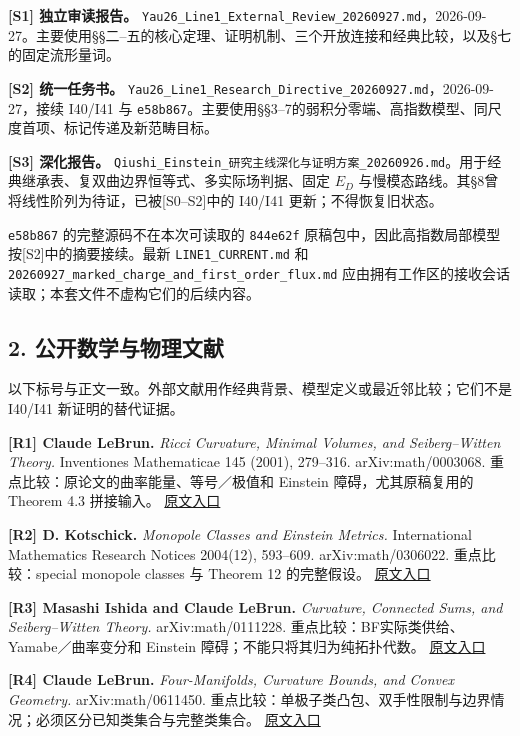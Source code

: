 \documentclass[UTF8,a4paper,11pt,fontset=fandol]{ctexart}
\begin{document}
\textbf{{[}S1{]} 独立审读报告。}
\texttt{Yau26\_Line1\_External\_Review\_20260927.md}，2026-09-27。主要使用§§二--五的核心定理、证明机制、三个开放连接和经典比较，以及§七的固定流形量词。

\textbf{{[}S2{]} 统一任务书。}
\texttt{Yau26\_Line1\_Research\_Directive\_20260927.md}，2026-09-27，接续
I40/I41 与
\texttt{e58b867}。主要使用§§3--7的弱积分零端、高指数模型、同尺度首项、标记传递及新范畴目标。

\textbf{{[}S3{]} 深化报告。}
\texttt{Qiushi\_Einstein\_研究主线深化与证明方案\_20260926.md}。用于经典继承表、复双曲边界恒等式、多实际场判据、固定
\(E_D\) 与慢模态路线。其§8曾将线性阶列为待证，已被{[}S0--S2{]}中的
I40/I41 更新；不得恢复旧状态。

\texttt{e58b867} 的完整源码不在本次可读取的 \texttt{844e62f}
原稿包中，因此高指数局部模型按{[}S2{]}中的摘要接续。最新
\texttt{LINE1\_CURRENT.md} 和
\texttt{20260927\_marked\_charge\_and\_first\_order\_flux.md}
应由拥有工作区的接收会话读取；本套文件不虚构它们的后续内容。

\subsection{2.
公开数学与物理文献}\label{ux516cux5f00ux6570ux5b66ux4e0eux7269ux7406ux6587ux732e}

以下标号与正文一致。外部文献用作经典背景、模型定义或最近邻比较；它们不是
I40/I41 新证明的替代证据。

\textbf{{[}R1{]} Claude LeBrun.} \emph{Ricci Curvature, Minimal Volumes,
and Seiberg--Witten Theory.} Inventiones Mathematicae 145 (2001),
279--316. arXiv:math/0003068. 重点比较：原论文的曲率能量、等号／极值和
Einstein 障碍，尤其原稿复用的 Theorem 4.3 拼接输入。
\href{https://arxiv.org/abs/math/0003068}{原文入口}

\textbf{{[}R2{]} D. Kotschick.} \emph{Monopole Classes and Einstein
Metrics.} International Mathematics Research Notices 2004(12), 593--609.
arXiv:math/0306022. 重点比较：special monopole classes 与 Theorem 12
的完整假设。 \href{https://arxiv.org/abs/math/0306022}{原文入口}

\textbf{{[}R3{]} Masashi Ishida and Claude LeBrun.} \emph{Curvature,
Connected Sums, and Seiberg--Witten Theory.} arXiv:math/0111228.
重点比较：BF实际类供给、Yamabe／曲率变分和 Einstein
障碍；不能只将其归为纯拓扑代数。
\href{https://arxiv.org/abs/math/0111228}{原文入口}

\textbf{{[}R4{]} Claude LeBrun.} \emph{Four-Manifolds, Curvature Bounds,
and Convex Geometry.} arXiv:math/0611450.
重点比较：单极子类凸包、双手性限制与边界情况；必须区分已知类集合与完整类集合。
\href{https://arxiv.org/abs/math/0611450}{原文入口}
\end{document}
